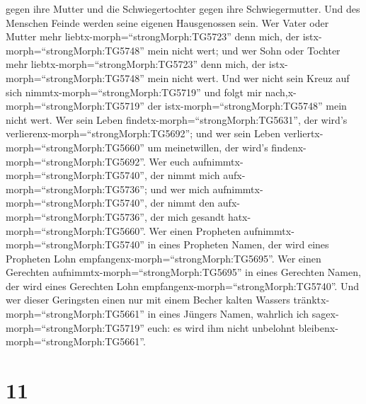 gegen ihre Mutter und die Schwiegertochter gegen ihre Schwiegermutter.
 Und des Menschen Feinde werden seine eigenen Hausgenossen
sein.  Wer Vater oder Mutter mehr
liebtx-morph=``strongMorph:TG5723'' denn mich, der
istx-morph=``strongMorph:TG5748'' mein nicht wert; und wer Sohn oder
Tochter mehr liebtx-morph=``strongMorph:TG5723'' denn mich, der
istx-morph=``strongMorph:TG5748'' mein nicht wert.  Und wer
nicht sein Kreuz auf sich nimmtx-morph=``strongMorph:TG5719'' und folgt
mir nach,x-morph=``strongMorph:TG5719'' der
istx-morph=``strongMorph:TG5748'' mein nicht wert.  Wer
sein Leben findetx-morph=``strongMorph:TG5631'', der wird's
verlierenx-morph=``strongMorph:TG5692''; und wer sein Leben
verliertx-morph=``strongMorph:TG5660'' um meinetwillen, der wird's
findenx-morph=``strongMorph:TG5692''.  Wer euch
aufnimmtx-morph=``strongMorph:TG5740'', der nimmt mich
aufx-morph=``strongMorph:TG5736''; und wer mich
aufnimmtx-morph=``strongMorph:TG5740'', der nimmt den
aufx-morph=``strongMorph:TG5736'', der mich gesandt
hatx-morph=``strongMorph:TG5660''.  Wer einen Propheten
aufnimmtx-morph=``strongMorph:TG5740'' in eines Propheten Namen, der
wird eines Propheten Lohn empfangenx-morph=``strongMorph:TG5695''. Wer
einen Gerechten aufnimmtx-morph=``strongMorph:TG5695'' in eines
Gerechten Namen, der wird eines Gerechten Lohn
empfangenx-morph=``strongMorph:TG5740''.  Und wer dieser
Geringsten einen nur mit einem Becher kalten Wassers
tränktx-morph=``strongMorph:TG5661'' in eines Jüngers Namen, wahrlich
ich sagex-morph=``strongMorph:TG5719'' euch: es wird ihm nicht unbelohnt
bleibenx-morph=``strongMorph:TG5661''.

\hypertarget{section-10}{%
\section{11}\label{section-10}}

